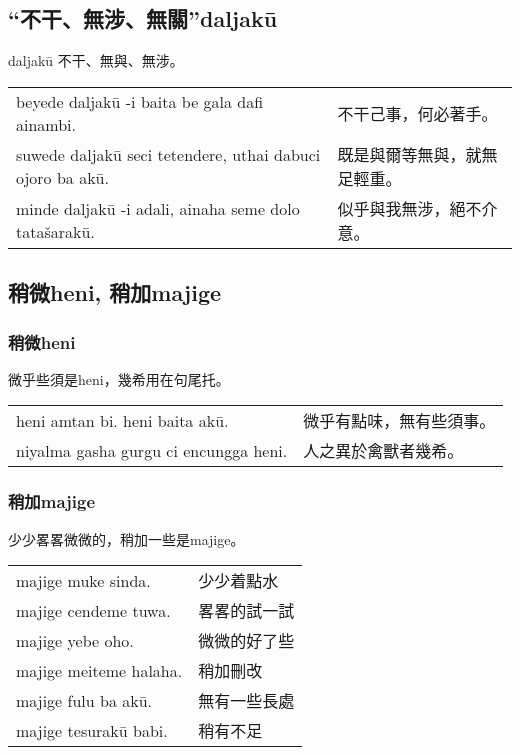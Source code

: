 \documentclass{article}
\begin{document}
\subsection{“不干、無涉、無關”daljak\={u}}
\noindent daljak\={u} 不干、無與、無涉。\\
\begin{center}
    \begin{tabularx}{\textwidth}{XX}
        beyede daljak\={u} -i baita be gala dafi ainambi. & 不干己事，何必著手。\\
        suwede daljak\={u} seci tetendere, uthai dabuci ojoro ba ak\={u}. & 既是與爾等無與，就無足輕重。\\
        minde daljak\={u} -i adali, ainaha seme dolo tata\v{s}arak\={u}. & 似乎與我無涉，絕不介意。
    \end{tabularx}
\end{center}

\subsection{稍微heni, 稍加majige}
\subsubsection{稍微heni}
\noindent 微乎些須是heni，幾希用在句尾托。\\
\begin{center}
    \begin{tabularx}{\textwidth}{XX}
        heni amtan bi. heni baita ak\={u}. & 微乎有點味，無有些須事。\\
        niyalma gasha gurgu ci encungga heni. & 人之異於禽獸者幾希。
    \end{tabularx}
\end{center}

\subsubsection{稍加majige}
\noindent 少少畧畧微微的，稍加一些是majige。
\begin{center}
    \begin{tabularx}{\textwidth}{XX}
        majige muke sinda. & 少少着點水\\
        majige cendeme tuwa. & 畧畧的試一試\\
        majige yebe oho. & 微微的好了些\\
        majige meiteme halaha. & 稍加刪改\\
        majige fulu ba ak\={u}. & 無有一些長處\\
        majige tesurak\={u} babi. & 稍有不足
    \end{tabularx}
\end{center}
\end{document}

